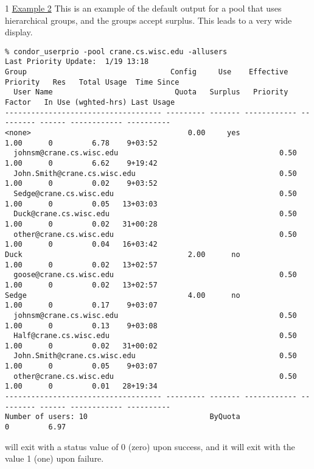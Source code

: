 \begin{ManPage}{\label{man-condor-userprio}}{1}
\underline{Example 2} This is an example of the default output for a pool
that uses hierarchical groups, and the groups accept surplus.
This leads to a very wide display.
\footnotesize
\begin{verbatim}
% condor_userprio -pool crane.cs.wisc.edu -allusers
Last Priority Update:  1/19 13:18
Group                                 Config     Use    Effective   Priority   Res   Total Usage  Time Since
  User Name                            Quota   Surplus   Priority    Factor   In Use (wghted-hrs) Last Usage
------------------------------------ --------- ------- ------------ --------- ------ ------------ ----------
<none>                                    0.00     yes                   1.00      0         6.78    9+03:52
  johnsm@crane.cs.wisc.edu                                     0.50      1.00      0         6.62    9+19:42
  John.Smith@crane.cs.wisc.edu                                 0.50      1.00      0         0.02    9+03:52
  Sedge@crane.cs.wisc.edu                                      0.50      1.00      0         0.05   13+03:03
  Duck@crane.cs.wisc.edu                                       0.50      1.00      0         0.02   31+00:28
  other@crane.cs.wisc.edu                                      0.50      1.00      0         0.04   16+03:42
Duck                                      2.00      no                   1.00      0         0.02   13+02:57
  goose@crane.cs.wisc.edu                                      0.50      1.00      0         0.02   13+02:57
Sedge                                     4.00      no                   1.00      0         0.17    9+03:07
  johnsm@crane.cs.wisc.edu                                     0.50      1.00      0         0.13    9+03:08
  Half@crane.cs.wisc.edu                                       0.50      1.00      0         0.02   31+00:02
  John.Smith@crane.cs.wisc.edu                                 0.50      1.00      0         0.05    9+03:07
  other@crane.cs.wisc.edu                                      0.50      1.00      0         0.01   28+19:34
------------------------------------ --------- ------- ------------ --------- ------ ------------ ----------
Number of users: 10                            ByQuota                             0         6.97 
\end{verbatim}
\normalsize

\ExitStatus

 will exit with a status value of 0 (zero) upon success,
and it will exit with the value 1 (one) upon failure.

\end{ManPage}
